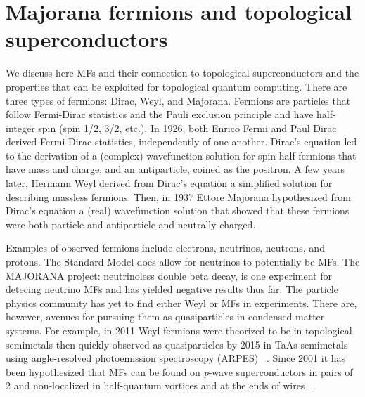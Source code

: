 \section{Majorana fermions and topological superconductors}

We discuss here MFs and their connection to topological superconductors and the properties that can be exploited for topological quantum computing.
There are three types of fermions: Dirac, Weyl, and Majorana.
Fermions are particles that follow Fermi-Dirac statistics and the Pauli exclusion principle and have half-integer spin (spin 1/2, 3/2, etc.).
In 1926, both Enrico Fermi and Paul Dirac derived Fermi-Dirac statistics, independently of one another.
Dirac's equation led to the derivation of a (complex) wavefunction solution for spin-half fermions that have mass and charge, and an antiparticle, coined as the positron.
A few years later, Hermann Weyl derived from Dirac's equation a simplified solution for describing massless fermions.
Then, in 1937 Ettore Majorana hypothesized from Dirac's equation a (real) wavefunction solution that showed that these fermions were both particle and antiparticle and neutrally charged.

Examples of observed fermions include electrons, neutrinos, neutrons, and protons.
The Standard Model does allow for neutrinos to potentially be MFs.
The MAJORANA project: neutrinoless double beta decay, is one experiment for detecing neutrino MFs and has yielded negative results thus far.
The particle physics community has yet to find either Weyl or MFs in experiments.
There are, however, avenues for pursuing them as quasiparticles in condensed matter systems.
For example, in 2011 Weyl fermions were theorized to be in topological semimetals then quickly observed as quasiparticles by 2015 in TaAs semimetals using angle-resolved photoemission spectroscopy (ARPES)  ~\cite{wanTopologicalSemimetalFermiarc2011, xuDiscoveryWeylFermion2015, liWeylSemimetalTaAs2016}.
Since 2001 it has been hypothesized that MFs can be found on \textit{p}-wave superconductors in pairs of 2 and non-localized in half-quantum vortices and at the ends of wires  ~\cite{ivanovNonAbelianStatisticsHalfQuantum2001, kitaevUnpairedMajoranaFermions2001}.

